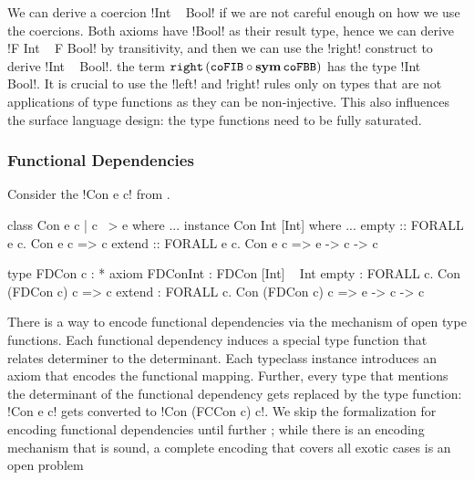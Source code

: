 \documentclass[screen,nonacm]{acmart}
\begin{document}
We can derive a coercion !Int ~ Bool! if we are not careful enough on how we use the coercions. Both axioms have !Bool! as their result type, hence we can derive !F Int ~ F Bool! by transitivity, and then we can use the !right! construct to derive !Int ~ Bool!. the term $\texttt{right}\,({\texttt{coFIB}} \circ {\textbf{sym}\,{\texttt{coFBB}}})$ has the type !Int ~ Bool!. It is crucial to use the !left! and !right! rules only on types that are not applications of type functions as they can be non-injective. This also influences the surface language design: the type functions need to be fully saturated.

\subsubsection{Functional Dependencies}\label{sec:fc-encodes-fundeps}
Consider the !Con e c! from .

\begin{minipage}[ht]{0.5\linewidth}
\begin{code}
class Con e c | c ~> e where ...
instance Con Int [Int] where ...
empty :: FORALL e c. Con e c => c
extend :: FORALL e c. Con e c => e -> c -> c
\end{code}
\end{minipage}%
\begin{minipage}[ht]{0.5\linewidth}
\begin{code}
type FDCon c : *
axiom FDConInt : FDCon [Int] ~ Int
empty  : FORALL c. Con (FDCon c) c => c
extend : FORALL c. Con (FDCon c) c => e -> c -> c
\end{code}
\end{minipage}

There is a way to encode functional dependencies via the mechanism of open type functions. Each functional dependency induces a special type function that relates determiner to the determinant. Each typeclass instance introduces an axiom that encodes the functional mapping. Further, every type that mentions the determinant of the functional dependency gets replaced by the type function: !Con e c! gets converted to !Con (FCCon c) c!.
We skip the formalization for encoding functional dependencies until further ; while there is an encoding mechanism that is sound, a complete encoding that covers all exotic cases is an open problem
\end{document}
